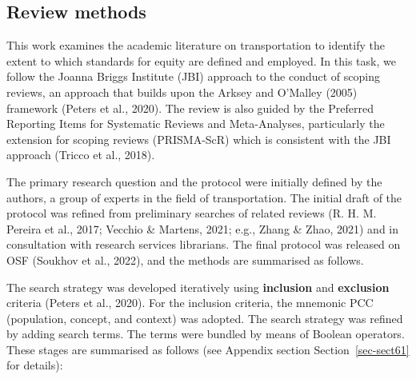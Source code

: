 \documentclass[
  letterpaper,
  DIV=11,
  numbers=noendperiod]{scrartcl}
\begin{document}
\subsection{Review methods}\label{review-methods}

This work examines the academic literature on transportation to identify
the extent to which standards for equity are defined and employed. In
this task, we follow the Joanna Briggs Institute (JBI) approach to the
conduct of scoping reviews, an approach that builds upon the Arksey and
O'Malley (2005) framework (Peters et al., 2020). The review is also
guided by the Preferred Reporting Items for Systematic Reviews and
Meta-Analyses, particularly the extension for scoping reviews
(PRISMA-ScR) which is consistent with the JBI approach (Tricco et al.,
2018).

The primary research question and the protocol were initially defined by
the authors, a group of experts in the field of transportation. The
initial draft of the protocol was refined from preliminary searches of
related reviews (R. H. M. Pereira et al., 2017; Vecchio \& Martens,
2021; e.g., Zhang \& Zhao, 2021) and in consultation with research
services librarians. The final protocol was released on OSF (Soukhov et
al., 2022), and the methods are summarised as follows.

The search strategy was developed iteratively using \textbf{inclusion}
and \textbf{exclusion} criteria (Peters et al., 2020). For the inclusion
criteria, the mnemonic PCC (population, concept, and context) was
adopted. The search strategy was refined by adding search terms. The
terms were bundled by means of Boolean operators. These stages are
summarised as follows (see Appendix section Section~\ref{sec-sect61} for
details):
\end{document}
